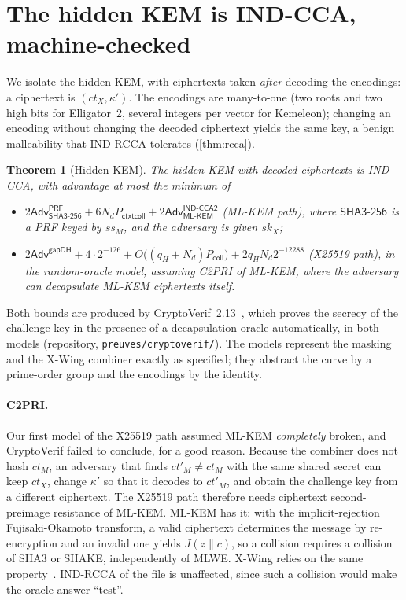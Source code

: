 \documentclass[11pt,a4paper]{article}
\newtheorem{theorem}{Theorem}
\theoremstyle{definition}
\theoremstyle{remark}
\newcommand{\Adv}{\mathsf{Adv}}
\newcommand{\SHA}{\mathsf{SHA3\text{-}256}}
\begin{document}
\section{The hidden KEM is IND-CCA, machine-checked}
\label{sec:cv}

We isolate the hidden KEM, with ciphertexts taken \emph{after} decoding the encodings: a ciphertext is $(ct_X,\kappa')$. The encodings are many-to-one (two roots and two high bits for Elligator~2, several integers per vector for Kemeleon); changing an encoding without changing the decoded ciphertext yields the same key, a benign malleability that IND-RCCA tolerates (\cref{thm:rcca}).

\begin{theorem}[Hidden KEM]
\label{thm:kem}
The hidden KEM with decoded ciphertexts is IND-CCA, with advantage at most the minimum of
\begin{itemize}
\item $2\Adv^{\mathsf{PRF}}_{\SHA} + 6N_d P_{\mathsf{ctxtcoll}} + 2\Adv^{\mathsf{IND\text{-}CCA2}}_{\mathsf{ML\text{-}KEM}}$ (ML-KEM path), where $\SHA$ is a PRF keyed by $ss_M$, and the adversary is \emph{given} $sk_X$;
\item $2\Adv^{\mathsf{gapDH}} + 4\cdot 2^{-126} + O\big((q_H+N_d)P_{\mathsf{coll}}\big) + 2q_H N_d 2^{-12288}$ (X25519 path), in the random-oracle model, assuming C2PRI of ML-KEM, where the adversary can decapsulate ML-KEM ciphertexts itself.
\end{itemize}
\end{theorem}

Both bounds are produced by CryptoVerif~2.13~\cite{cryptoverif}, which proves the secrecy of the challenge key in the presence of a decapsulation oracle automatically, in both models (repository, \texttt{preuves/cryptoverif/}). The models represent the masking and the X-Wing combiner exactly as specified; they abstract the curve by a prime-order group and the encodings by the identity.

\paragraph{C2PRI.} Our first model of the X25519 path assumed ML-KEM \emph{completely} broken, and CryptoVerif failed to conclude, for a good reason. Because the combiner does not hash $ct_M$, an adversary that finds $ct'_M\neq ct_M$ with the same shared secret can keep $ct_X$, change $\kappa'$ so that it decodes to $ct'_M$, and obtain the challenge key from a different ciphertext. The X25519 path therefore needs ciphertext second-preimage resistance of ML-KEM. ML-KEM has it: with the implicit-rejection Fujisaki-Okamoto transform, a valid ciphertext determines the message by re-encryption and an invalid one yields $J(z\|c)$, so a collision requires a collision of SHA3 or SHAKE, independently of MLWE. X-Wing relies on the same property~\cite{xwing}. IND-RCCA of the file is unaffected, since such a collision would make the oracle answer ``test''.
\end{document}
